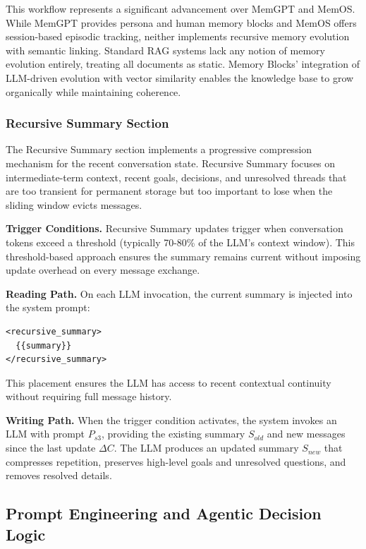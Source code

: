 ﻿\documentclass[12pt,a4paper]{article}
\begin{document}
This workflow represents a significant advancement over MemGPT and MemOS. While MemGPT provides persona and human memory blocks and MemOS offers session-based episodic tracking, neither implements recursive memory evolution with semantic linking. Standard RAG systems lack any notion of memory evolution entirely, treating all documents as static. Memory Blocks' integration of LLM-driven evolution with vector similarity enables the knowledge base to grow organically while maintaining coherence.

\subsubsection{Recursive Summary Section}

The Recursive Summary section implements a progressive compression mechanism for the recent conversation state. Recursive Summary focuses on intermediate-term context, recent goals, decisions, and unresolved threads that are too transient for permanent storage but too important to lose when the sliding window evicts messages.

\textbf{Trigger Conditions.} Recursive Summary updates trigger when conversation tokens exceed a threshold (typically 70-80\% of the LLM's context window). This threshold-based approach ensures the summary remains current without imposing update overhead on every message exchange.

\textbf{Reading Path.} On each LLM invocation, the current summary is injected into the system prompt:

\begin{verbatim}
<recursive_summary>
  {{summary}}
</recursive_summary>
\end{verbatim}

This placement ensures the LLM has access to recent contextual continuity without requiring full message history.

\textbf{Writing Path.} When the trigger condition activates, the system invokes an LLM with prompt $P_{s3}$, providing the existing summary $S_{old}$ and new messages since the last update $\Delta C$. The LLM produces an updated summary $S_{new}$ that compresses repetition, preserves high-level goals and unresolved questions, and removes resolved details.

\subsection{Prompt Engineering and Agentic Decision Logic}
\end{document}
